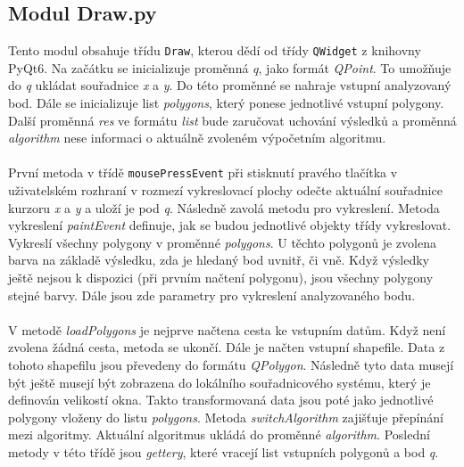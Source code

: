 \documentclass{article}
\begin{document}
\subsection{\small{Modul Draw.py}}
Tento modul obsahuje třídu \texttt{Draw}, kterou dědí od třídy \texttt{QWidget} z knihovny PyQt6. Na začátku se inicializuje proměnná \emph{q}, jako formát \emph{QPoint}. To umožňuje do \emph{q} ukládat souřadnice \emph{x} a \emph{y}. Do této proměnné se nahraje vstupní analyzovaný bod. Dále se inicializuje list \emph{polygons}, který ponese jednotlivé vstupní polygony. Další proměnná \emph{res} ve formátu \emph{list} bude zaručovat uchování výsledků a proměnná \emph{algorithm} nese informaci o aktuálně zvoleném výpočetním algoritmu.\\
\vspace{0.2cm}\\
První metoda v třídě \texttt{mousePressEvent} při stisknutí pravého tlačítka v uživatelském rozhraní v rozmezí vykreslovací plochy odečte aktuální souřadnice kurzoru \emph{x} a \emph{y} a uloží je pod \emph{q}. Následně zavolá metodu pro vykreslení. Metoda vykreslení \emph{paintEvent} definuje, jak se budou jednotlivé objekty třídy vykreslovat. Vykreslí všechny polygony v proměnné \emph{polygons}. U těchto polygonů je zvolena barva na základě výsledku, zda je hledaný bod uvnitř, či vně. Když výsledky ještě nejsou k dispozici (při prvním načtení polygonu), jsou všechny polygony stejné barvy. Dále jsou zde parametry pro vykreslení analyzovaného bodu.\\
\vspace{0.2cm}\\
V metodě \emph{loadPolygons} je nejprve načtena cesta ke vstupním datům. Když není zvolena žádná cesta, metoda se ukončí. Dále je načten vstupní shapefile. Data z tohoto shapefilu jsou převedeny do formátu \emph{QPolygon}. Následně tyto data musejí být ještě musejí být zobrazena do lokálního souřadnicového systému, který je definován velikostí okna. Takto transformovaná data jsou poté jako jednotlivé polygony vloženy do listu \emph{polygons}. Metoda \emph{switchAlgorithm} zajišťuje přepínání mezi algoritmy. Aktuální algoritmus ukládá do proměnné \emph{algorithm}. Poslední metody v této třídě jsou \emph{gettery}, které vracejí list vstupních polygonů a bod \emph{q}.
\end{document}
